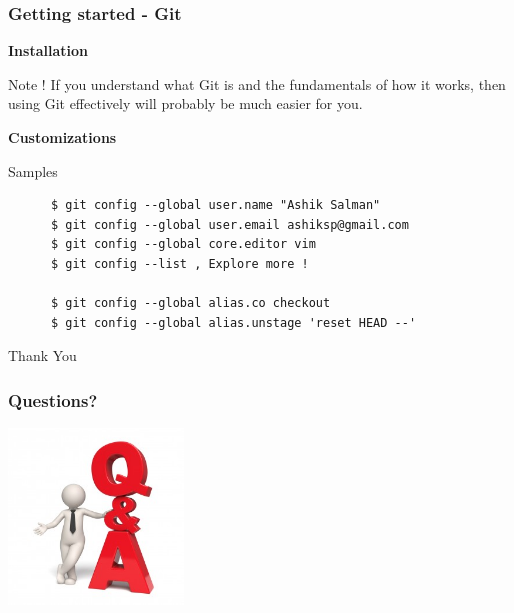 \documentclass[10pt]{beamer}
\begin{document}
\begin{frame}[fragile]
  \frametitle{Getting started - Git}
  \textbf{Installation}
  \begin{exampleblock}{Note !}
    If you understand what Git is and the fundamentals of how it works, then using Git effectively
    will probably be much easier for you.
  \end{exampleblock}
  \textbf{Customizations} \\
  \pause
  \begin{block}{Samples}
    \begin{verbatim}
      $ git config --global user.name "Ashik Salman"
      $ git config --global user.email ashiksp@gmail.com
      $ git config --global core.editor vim
      $ git config --list , Explore more !

      $ git config --global alias.co checkout
      $ git config --global alias.unstage 'reset HEAD --'
    \end{verbatim}
  \end{block}
\end{frame}

\begin{frame}
  \begin{center}
    \Huge{Thank You}
  \end{center}
\end{frame}

\begin{frame}
	\frametitle{Questions?}
	\begin{center}
	\includegraphics[width=0.35\textwidth]{q2.jpg}
	\end{center}
\end{frame}

\end{document}
